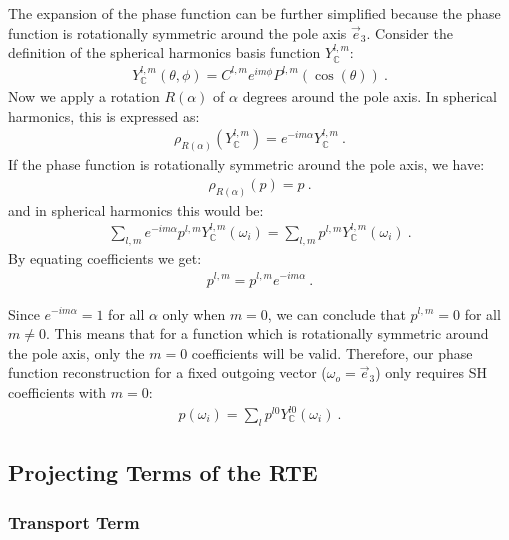 \documentclass{egpubl}
\newcommand{\SHBC}{Y_{\mathbb{C}}} %
\begin{document}
The expansion of the phase function can be further simplified because the phase function is rotationally symmetric around the pole axis $\vec{e}_3$. Consider the definition of the spherical harmonics basis function $\SHBC^{l,m}$:
\begin{align*}
\SHBC^{l,m}(\theta, \phi) = C^{l,m}e^{im\phi}P^{l,m}(\operatorname{cos}(\theta)) \ .
\end{align*}
Now we apply a rotation $R(\alpha)$ of $\alpha$ degrees around the pole axis. In spherical harmonics, this is expressed as:
\begin{align*}
\rho_{R(\alpha)}(\SHBC^{l,m}) = e^{-i m\alpha}\SHBC^{l,m} \ .
\end{align*}
If the phase function is rotationally symmetric around the pole axis, we have:
\begin{align*}
\rho_{R(\alpha)}(p) = p \ .
\end{align*}
and in spherical harmonics this would be:
\begin{align*}
\sum_{l,m}
{
e^{-i m\alpha}
p^{l,m}
\SHBC^{l,m} }\left(\omega_i\right)
=
\sum_{l,m}
{
p^{l,m}
\SHBC^{l,m}\left(\omega_i\right)
} \ .
\end{align*}
By equating coefficients we get:
\begin{align*}
p^{l,m} = p^{l,m}e^{-i m\alpha} \ .
\end{align*}

Since $e^{-i m\alpha}=1$ for all $\alpha$ only when $m=0$, we can conclude that $p^{l,m} = 0$ for all $m\ne0$. This means that for a function which is rotationally symmetric around the pole axis, only the $m=0$ coefficients will be valid. Therefore, our phase function reconstruction for a fixed outgoing vector ($\omega_o=\vec{e}_3$) only requires SH coefficients with $m=0$:
\begin{align}
\label{eq:sh_exp_phase}
p(\omega_i) =
\sum_l
{
p^{l0}
\SHBC^{l0}(\omega_i)
} \ .
\end{align}
%


\subsection{Projecting Terms of the RTE}

\subsubsection{Transport Term}
\label{sec:complex_transport_term}
\end{document}
